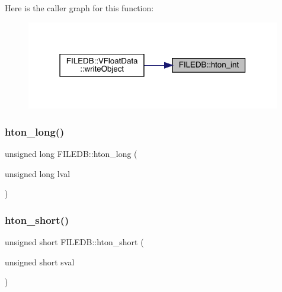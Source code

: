 Here is the caller graph for this function\+:\nopagebreak
\begin{figure}[H]
\begin{center}
\leavevmode
\includegraphics[width=315pt]{d2/de6/namespaceFILEDB_adbce406e3e06947d7312a6d461bc5cc5_icgraph}
\end{center}
\end{figure}
\mbox{\label{namespaceFILEDB_af381773a642a4cc9c68ce682cea411a8}} 
\subsubsection{\texorpdfstring{hton\_long()}{hton\_long()}}
{\footnotesize\ttfamily unsigned long F\+I\+L\+E\+D\+B\+::hton\+\_\+long (\begin{DoxyParamCaption}\item[{unsigned long}]{lval }\end{DoxyParamCaption})}

\mbox{\label{namespaceFILEDB_acbb57ab648e150c1950a7e6a67a6aa56}} 
\subsubsection{\texorpdfstring{hton\_short()}{hton\_short()}}
{\footnotesize\ttfamily unsigned short F\+I\+L\+E\+D\+B\+::hton\+\_\+short (\begin{DoxyParamCaption}\item[{unsigned short}]{sval }\end{DoxyParamCaption})}

